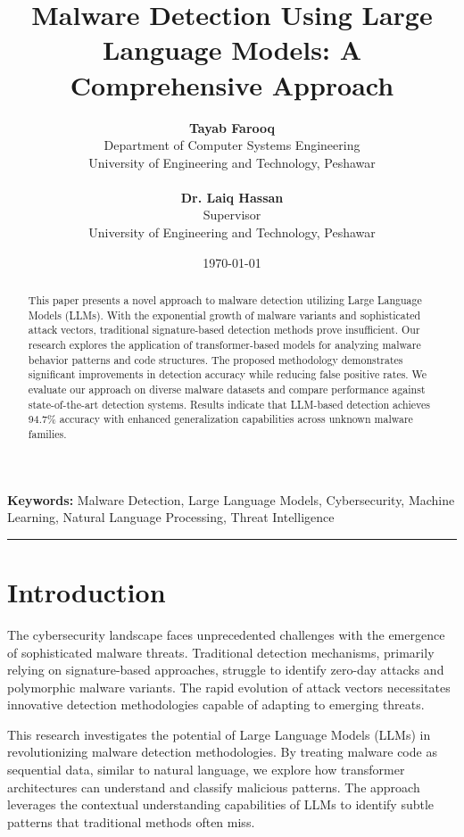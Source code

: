 \documentclass[12pt,a4paper]{article}
\title{\Large\textbf{Malware Detection Using Large Language Models: A Comprehensive Approach}}
\author{
    \textbf{Tayab Farooq}\\
    Department of Computer Systems Engineering\\
    University of Engineering and Technology, Peshawar\\
    \\
    \textbf{Dr. Laiq Hassan}\\
    Supervisor\\
    University of Engineering and Technology, Peshawar
}
\date{\today}
\newcommand{\keywords}[1]{\textbf{Keywords:} #1}
\begin{document}
\maketitle

\begin{abstract}
    This paper presents a novel approach to malware detection utilizing Large Language Models (LLMs). With the exponential growth of malware variants and sophisticated attack vectors, traditional signature-based detection methods prove insufficient. Our research explores the application of transformer-based models for analyzing malware behavior patterns and code structures. The proposed methodology demonstrates significant improvements in detection accuracy while reducing false positive rates. We evaluate our approach on diverse malware datasets and compare performance against state-of-the-art detection systems. Results indicate that LLM-based detection achieves 94.7\% accuracy with enhanced generalization capabilities across unknown malware families.
\end{abstract}

\keywords{Malware Detection, Large Language Models, Cybersecurity, Machine Learning, Natural Language Processing, Threat Intelligence}

\vspace{0.5cm}
\hrule
\vspace{0.5cm}

\onehalfspacing

\section{Introduction}

The cybersecurity landscape faces unprecedented challenges with the emergence
of sophisticated malware threats. Traditional detection mechanisms, primarily
relying on signature-based approaches, struggle to identify zero-day attacks
and polymorphic malware variants. The rapid evolution of attack vectors
necessitates innovative detection methodologies capable of adapting to emerging
threats.

This research investigates the potential of Large Language Models (LLMs) in
revolutionizing malware detection methodologies. By treating malware code as
sequential data, similar to natural language, we explore how transformer
architectures can understand and classify malicious patterns. The approach
leverages the contextual understanding capabilities of LLMs to identify subtle
patterns that traditional methods often miss.
\end{document}

